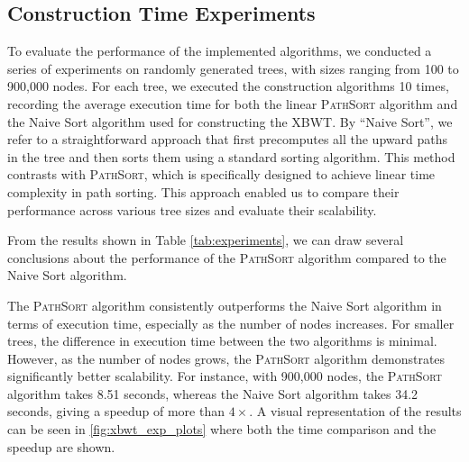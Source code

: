 \subsection{Construction Time Experiments} 

To evaluate the performance of the implemented algorithms, we conducted a series of experiments on randomly generated trees, with sizes ranging from 100 to 900,000 nodes. For each tree, we executed the construction algorithms 10 times, recording the average execution time for both the linear \textsc{PathSort} algorithm and the Naive Sort algorithm used for constructing the XBWT.
By ``Naive Sort'', we refer to a straightforward approach that first precomputes all the upward paths in the tree and then sorts them using a standard sorting algorithm. This method contrasts with \textsc{PathSort}, which is specifically designed to achieve linear time complexity in path sorting.
This approach enabled us to compare their performance across various tree sizes and evaluate their scalability.

From the results shown in Table \cref{tab:experiments}, we can draw several conclusions about the performance of the \textsc{PathSort} algorithm compared to the Naive Sort algorithm.

The \textsc{PathSort} algorithm consistently outperforms the Naive Sort algorithm in terms of execution time, especially as the number of nodes increases. For smaller trees, the difference in execution time between the two algorithms is minimal. However, as the number of nodes grows, the \textsc{PathSort} algorithm demonstrates significantly better scalability. For instance, with 900,000 nodes, the \textsc{PathSort} algorithm takes 8.51 seconds, whereas the Naive Sort algorithm takes 34.2 seconds, giving a speedup of more than $4\times$. A visual representation of the results can be seen in \cref{fig:xbwt_exp_plots} where both the time comparison and the speedup are shown.

